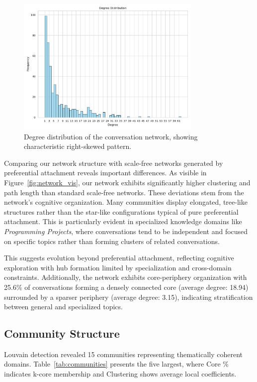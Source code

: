 \documentclass{svproc}
\begin{document}
\begin{figure}[!htbp]
\centering
\includegraphics[width=3.5in]{./images/degree_distribution_histogram.pdf}
\caption{Degree distribution of the conversation network, showing characteristic right-skewed pattern.}
\label{fig:degree_hist}
\end{figure}

Comparing our network structure with scale-free networks generated by preferential attachment reveals important differences. As visible in Figure~\ref{fig:network_vis}, our network exhibits significantly higher clustering and path length than standard scale-free networks. These deviations stem from the network's cognitive organization. Many communities display elongated, tree-like structures rather than the star-like configurations typical of pure preferential attachment. This is particularly evident in specialized knowledge domains like \emph{Programming Projects}, where conversations tend to be independent and focused on specific topics rather than forming clusters of related conversations.

This suggests evolution beyond preferential attachment, reflecting cognitive exploration with hub formation limited by specialization and cross-domain constraints. Additionally, the network exhibits core-periphery organization with 25.6\% of conversations forming a densely connected core (average degree: 18.94) surrounded by a sparser periphery (average degree: 3.15), indicating stratification between general and specialized topics.

\subsection{Community Structure}
\label{community_structure}

Louvain detection revealed 15 communities representing thematically coherent domains. Table~\ref{tab:communities} presents the five largest, where Core \% indicates k-core membership \cite{seidman1983} and Clustering shows average local coefficients.
\end{document}

